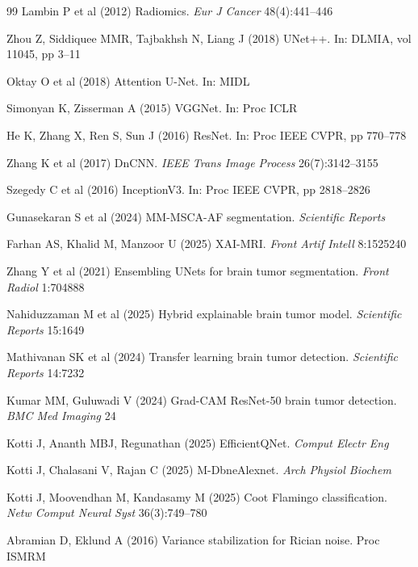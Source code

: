 \documentclass[sn-mathphys-num]{sn-jnl}
\begin{document}
\begin{thebibliography}{99}
Lambin P et al (2012) Radiomics.
\textit{Eur J Cancer} 48(4):441--446

Zhou Z, Siddiquee MMR, Tajbakhsh N, Liang J (2018) UNet++.
In: DLMIA, vol 11045, pp 3--11

Oktay O et al (2018) Attention U-Net.
In: MIDL

Simonyan K, Zisserman A (2015) VGGNet.
In: Proc ICLR

He K, Zhang X, Ren S, Sun J (2016) ResNet.
In: Proc IEEE CVPR, pp 770--778

Zhang K et al (2017) DnCNN.
\textit{IEEE Trans Image Process} 26(7):3142--3155

Szegedy C et al (2016) InceptionV3.
In: Proc IEEE CVPR, pp 2818--2826

Gunasekaran S et al (2024) MM-MSCA-AF segmentation.
\textit{Scientific Reports}

Farhan AS, Khalid M, Manzoor U (2025) XAI-MRI.
\textit{Front Artif Intell} 8:1525240

Zhang Y et al (2021) Ensembling UNets for brain tumor segmentation.
\textit{Front Radiol} 1:704888

Nahiduzzaman M et al (2025) Hybrid explainable brain tumor model.
\textit{Scientific Reports} 15:1649

Mathivanan SK et al (2024) Transfer learning brain tumor detection.
\textit{Scientific Reports} 14:7232

Kumar MM, Guluwadi V (2024) Grad-CAM ResNet-50 brain tumor detection.
\textit{BMC Med Imaging} 24

Kotti J, Ananth MBJ, Regunathan (2025) EfficientQNet.
\textit{Comput Electr Eng}

Kotti J, Chalasani V, Rajan C (2025) M-DbneAlexnet.
\textit{Arch Physiol Biochem}

Kotti J, Moovendhan M, Kandasamy M (2025) Coot Flamingo classification.
\textit{Netw Comput Neural Syst} 36(3):749--780

Abramian D, Eklund A (2016) Variance stabilization for Rician noise.
Proc ISMRM

\end{thebibliography}
\end{document}
